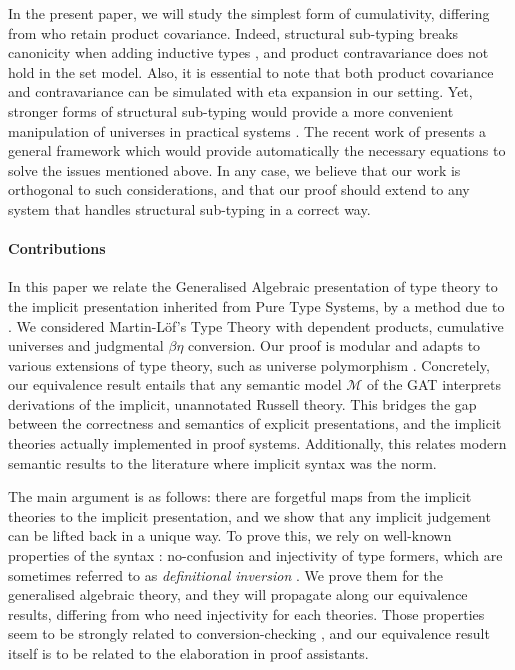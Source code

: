 In the present paper, we will study the simplest form of cumulativity, differing from \citet{tiago-fscd} who retain product covariance. Indeed, structural sub-typing breaks canonicity when adding inductive types \cite{Luo}, and product contravariance does not hold in the set model. Also, it is essential to note that both product covariance and contravariance can be simulated with eta expansion in our setting. Yet, stronger forms of structural sub-typing would provide a more convenient manipulation of universes in practical systems \cite{subtyping}. The recent work of \citet{AdapTT} presents a general framework which would provide automatically the necessary equations to solve the issues mentioned above. In any case, we believe that our work is orthogonal to such considerations, and that our proof should extend to any system that handles structural sub-typing in a correct way.

\paragraph*{Contributions} In this paper we relate the Generalised Algebraic presentation of type theory to the implicit presentation inherited from Pure Type Systems, by a method due to \citet{Streicher}. We considered Martin-Löf's Type Theory with dependent products, cumulative universes and judgmental $\beta\eta$ conversion. Our proof is modular and adapts to various extensions of type theory, such as universe polymorphism \cite{polymorphism}.
Concretely, our equivalence result entails that any semantic model $\mathcal{M}$ of the GAT interprets derivations of the implicit, unannotated Russell theory.
This bridges the gap between the correctness and semantics of explicit presentations, and the implicit theories actually implemented in proof systems.
Additionally, this relates modern semantic results to the literature where implicit syntax was the norm.

The main argument is as follows: there are forgetful maps from the implicit theories to the
implicit presentation, and we show that any implicit judgement can be lifted back in a unique way.
To prove this, we rely on well-known properties of the syntax : no-confusion and injectivity of type formers, which are sometimes referred to as \textit{definitional inversion} \cite{definitional-inv}.
We prove them for the generalised algebraic theory, and they will propagate along our equivalence results, differing from \citet{tiago-fscd} who need injectivity for each theories.
Those properties seem to be strongly related to conversion-checking \cite{meven}, and our equivalence result itself is to be related to the elaboration in proof assistants.

